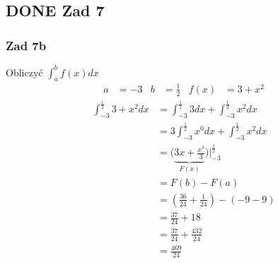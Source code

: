 \documentclass[11pt]{article}
\begin{document}
\subsection{{\bfseries\sffamily DONE} Zad 7}
\label{sec:org596559c}
\subsubsection{Zad 7b}
\label{sec:org80f5eaa}
Obliczyć \(\displaystyle\int_a^b f(x) dx\)
\begin{align*}
a &= -3 & b &= \frac{1}{2} & f(x)&=3+x^2
\end{align*}
\begin{align*}
  \int_{-3}^\frac{1}{2} 3 + x^2 dx
  &= \int_{-3}^{\frac{1}{2}} 3 dx + \int_{-3}^{\frac{1}{2}} x^{2} dx
  \\
  &= 3 \int_{-3}^{\frac{1}{2}} x^{0} dx + \int_{-3}^{\frac{1}{2}} x^{2} dx
  \\
  &= \Big ( \underbrace{ 3x + \frac{x^{3}}{3} }_{F(x)} \Big) \Bigg|_{-3}^{\frac{1}{2}}
  \\
  &= F(b) - F(a)
  \\
  &= \left(\frac{36}{24} + \frac{1}{24} \right) - (-9 -9)
  \\
  &= \frac{37}{24} + 18
  \\
  &= \frac{37}{24} + \frac{432}{24}
  \\
  &=\frac{469}{24}
\end{align*}
\end{document}
